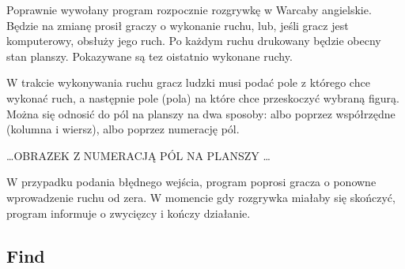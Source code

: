 Poprawnie wywołany program rozpocznie rozgrywkę w Warcaby angielskie. Będzie na zmianę prosił graczy o wykonanie ruchu, lub, jeśli gracz jest komputerowy, obsłuży jego ruch. Po każdym ruchu drukowany będzie obecny stan planszy. Pokazywane są tez oistatnio wykonane ruchy.

W trakcie wykonywania ruchu gracz ludzki musi podać pole z którego chce wykonać ruch, a następnie pole (pola) na które chce przeskoczyć wybraną figurą. Można się odnosić do pól na planszy na dwa sposoby: albo poprzez współrzędne (kolumna i wiersz), albo poprzez numerację pól.

\ldots OBRAZEK Z NUMERACJĄ PÓL NA PLANSZY \ldots

W przypadku podania błędnego wejścia, program poprosi gracza o ponowne wprowadzenie ruchu od zera. W momencie gdy rozgrywka miałaby się skończyć, program informuje o zwycięzcy i kończy działanie.

\subsection{Find}

